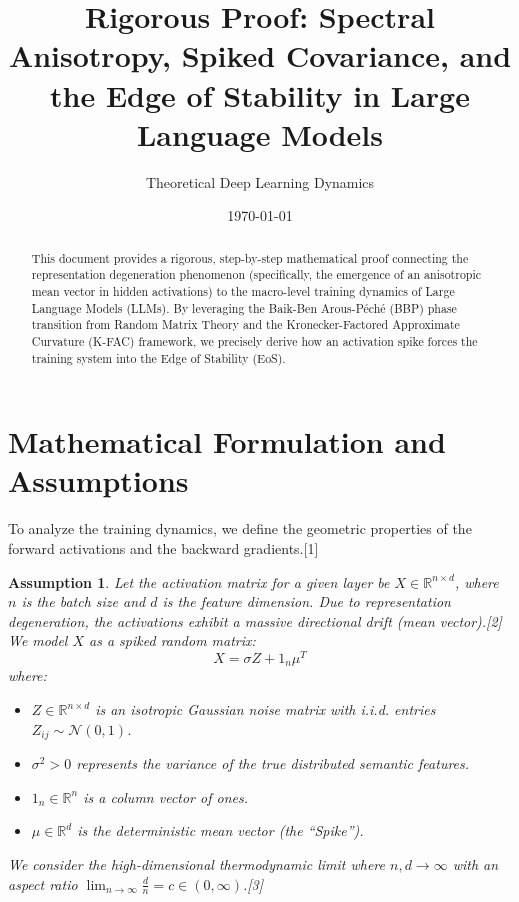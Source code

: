 \documentclass[11pt, a4paper]{article}
\title{Rigorous Proof: Spectral Anisotropy, Spiked Covariance, and the Edge of Stability in Large Language Models}
\author{Theoretical Deep Learning Dynamics}
\date{\today}
\newtheorem{assumption}{Assumption}
\begin{document}
\maketitle

\begin{abstract}
This document provides a rigorous, step-by-step mathematical proof connecting the representation degeneration phenomenon (specifically, the emergence of an anisotropic mean vector in hidden activations) to the macro-level training dynamics of Large Language Models (LLMs). By leveraging the Baik-Ben Arous-P\'ech\'e (BBP) phase transition from Random Matrix Theory and the Kronecker-Factored Approximate Curvature (K-FAC) framework, we precisely derive how an activation spike forces the training system into the Edge of Stability (EoS).
\end{abstract}

\section{Mathematical Formulation and Assumptions}

To analyze the training dynamics, we define the geometric properties of the forward activations and the backward gradients.[1]

\begin{assumption}
Let the activation matrix for a given layer be $X \in \mathbb{R}^{n \times d}$, where $n$ is the batch size and $d$ is the feature dimension. Due to representation degeneration, the activations exhibit a massive directional drift (mean vector).[2] We model $X$ as a spiked random matrix:
\begin{equation}
    X = \sigma Z + 1_n \mu^T
\end{equation}
where:
\begin{itemize}
    \item $Z \in \mathbb{R}^{n \times d}$ is an isotropic Gaussian noise matrix with i.i.d. entries $Z_{ij} \sim \mathcal{N}(0, 1)$.
    \item $\sigma^2 > 0$ represents the variance of the true distributed semantic features.
    \item $1_n \in \mathbb{R}^n$ is a column vector of ones.
    \item $\mu \in \mathbb{R}^d$ is the deterministic mean vector (the ``Spike'').
\end{itemize}
We consider the high-dimensional thermodynamic limit where $n, d \to \infty$ with an aspect ratio $\lim_{n \to \infty} \frac{d}{n} = c \in (0, \infty)$.[3]
\end{assumption}
\end{document}
